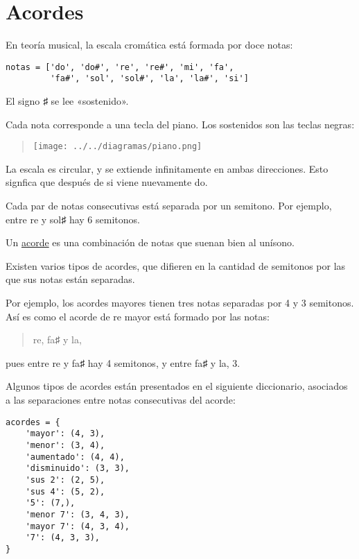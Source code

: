 \section{Acordes}

En teoría musical, la escala cromática está formada por doce notas:

\begin{lstlisting}
notas = ['do', 'do#', 're', 're#', 'mi', 'fa',
         'fa#', 'sol', 'sol#', 'la', 'la#', 'si']
\end{lstlisting}

El signo ♯ se lee «sostenido».

Cada nota corresponde a una tecla del piano. Los sostenidos son las
teclas negras:

\begin{quote}
\texttt{[image: ../../diagramas/piano.png]}
\end{quote}

La escala es circular, y se extiende infinitamente en ambas direcciones.
Esto signfica que después de si viene nuevamente do.

Cada par de notas consecutivas está separada por un semitono. Por
ejemplo, entre re y sol♯ hay 6 semitonos.

Un \href{http://es.wikipedia.org/wiki/Acorde}{acorde} es una combinación
de notas que suenan bien al unísono.

Existen varios tipos de acordes, que difieren en la cantidad de
semitonos por las que sus notas están separadas.

Por ejemplo, los acordes mayores tienen tres notas separadas por 4 y 3
semitonos. Así es como el acorde de re mayor está formado por las notas:

\begin{quote}
re, fa♯ y la,
\end{quote}

pues entre re y fa♯ hay 4 semitonos, y entre fa♯ y la, 3.

Algunos tipos de acordes están presentados en el siguiente diccionario,
asociados a las separaciones entre notas consecutivas del acorde:

\begin{lstlisting}
acordes = {
    'mayor': (4, 3),
    'menor': (3, 4),
    'aumentado': (4, 4),
    'disminuido': (3, 3),
    'sus 2': (2, 5),
    'sus 4': (5, 2),
    '5': (7,),
    'menor 7': (3, 4, 3),
    'mayor 7': (4, 3, 4),
    '7': (4, 3, 3),
}
\end{lstlisting}

